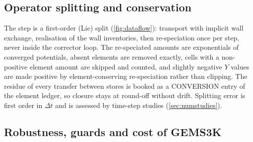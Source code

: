 \documentclass[11pt,a4paper]{article}
\begin{document}
\subsection{Operator splitting and conservation}

The step is a first-order (Lie) split (\cref{fig:dataflow}): transport
with implicit wall exchange, realisation of the wall inventories, then
re-speciation once per step, never inside the corrector loop. The
re-speciated amounts are exponentials of converged potentials, absent
elements are removed exactly, cells with a non-positive element amount
are skipped and counted, and slightly negative $Y$ values are made
positive by element-conserving re-speciation rather than clipping. The
residue of every transfer between stores is booked as a CONVERSION entry
of the element ledger, so closure stays at round-off without drift.
Splitting error is first order in $\Delta t$ and is assessed by
time-step studies (\cref{sec:numstudies}).

\subsection{Robustness, guards and cost of GEMS3K}
\label{sec:robustness}
\end{document}
